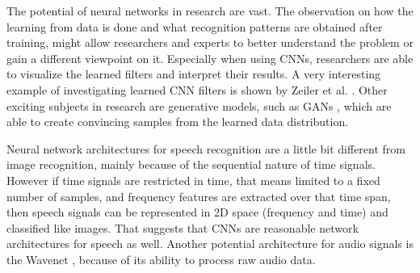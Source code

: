 The potential of neural networks in research are vast.
The observation on how the learning from data is done and what recognition patterns are obtained after training, might allow researchers and experts to better understand the problem or gain a different viewpoint on it.
Especially when using CNNs, researchers are able to visualize the learned filters and interpret their results.
A very interesting example of investigating learned CNN filters is shown by Zeiler et al. \cite{Zeiler2013}.
Other exciting subjects in research are generative models, such as GANs \cite{Goodfellow2014}, which are able to create convincing samples from the learned data distribution.

Neural network architectures for speech recognition are a little bit different from image recognition, mainly because of the sequential nature of time signals.
However if time signals are restricted in time, that means limited to a fixed number of samples, and frequency features are extracted over that time span, then speech signals can be represented in 2D space (frequency and time) and classified like images.
That suggests that CNNs are reasonable network architectures for speech as well.
Another potential architecture for audio signals is the Wavenet \cite{Oord2016}, because of its ability to process raw audio data.